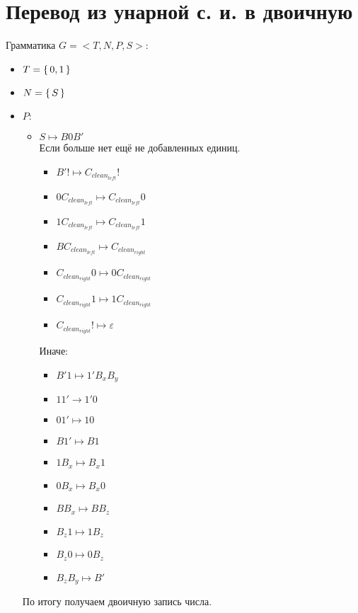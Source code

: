 \section{Перевод из унарной с. и. в двоичную}
Грамматика $G = <T, N, P, S>$:
\begin{itemize}
    \item $T = \set{0, 1}$
    \item $N = \set{S}$
    \item $P\colon$
        \begin{itemize}
            \item $S \mapsto B0B'$ \\
                Если больше нет ещё не добавленных единиц.
                \begin{itemize}
                    \item $B'! \mapsto C_{clean_{left}}!$
                    \item $0 C_{clean_{left}} \mapsto C_{clean_{left}} 0$ 
                    \item $1 C_{clean_{left}} \mapsto C_{clean_{left}} 1$ 
                    \item $B C_{clean_{left}} \mapsto C_{clean_{right}}$
                    \item $C_{clean_{right}}0 \mapsto 0C_{clean_{right}}$
                    \item $C_{clean_{right}}1 \mapsto 1C_{clean_{right}}$
                    \item $C_{clean_{right}}! \mapsto \varepsilon$
                \end{itemize}
                Иначе:
                \begin{itemize}
                    \item $B'1 \mapsto 1' B_{x}B_{y}$
                    \item $11' \rightarrow 1'0$
                    \item $01' \mapsto 10$
                    \item $B1' \mapsto B 1$
                    \item $1 B_{x} \mapsto B_{x} 1$
                    \item $0 B_{x} \mapsto B_{x} 0$
                    \item $BB_{x} \mapsto B B_{z}$
                    \item $B_{z} 1 \mapsto 1 B_{z}$
                    \item $B_{z} 0 \mapsto 0 B_{z}$
                    \item $B_{z} B_{y} \mapsto B'$
                \end{itemize}
        \end{itemize}
        По итогу получаем двоичную запись числа.
\end{itemize}
